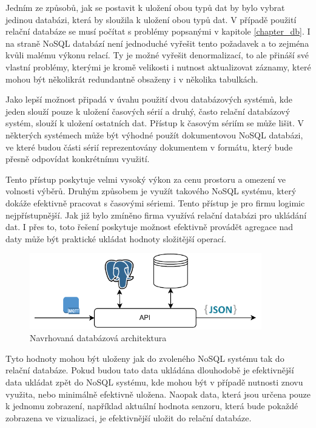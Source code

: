 Jedním ze způsobů, jak se postavit k uložení obou typů dat by bylo vybrat jedinou databázi, která by sloužila k uložení obou typů dat. V případě použití relační databáze se musí počítat s problémy popsanými v kapitole \ref{chapter_db}. I na straně NoSQL databází není jednoduché vyřešit tento požadavek a to zejména kvůli malému výkonu relací. Ty je možné vyřešit denormalizací, to ale přináší své vlastní problémy, kterými je kromě velikosti i nutnost aktualizovat záznamy, které mohou být několikrát redundantně obsaženy i v několika tabulkách.

Jako lepší možnost připadá v úvahu použití dvou databázových systémů, kde jeden slouží pouze k uložení časových sérií a druhý, často relační databázový systém, slouží k uložení ostatních dat. Přístup k časovým sériím se může lišit. V některých systémech může být výhodné použít dokumentovou NoSQL databázi, ve které budou části sérií reprezentovány dokumentem v formátu, který bude přesně odpovídat konkrétnímu využití.

Tento přístup poskytuje velmi vysoký výkon za cenu prostoru a omezení ve volnosti výběrů. Druhým způsobem je využít takového NoSQL systému, který dokáže efektivně pracovat s časovými sériemi. Tento přístup je pro firmu logimic nejpřístupnější. Jak již bylo zmíněno firma využívá relační databázi pro ukládání dat. I přes to, toto řešení poskytuje možnost efektivně provádět agregace nad daty může být praktické ukládat hodnoty složitější operací. 

\begin{figure}[H]
\label{question4}
\begin{center}
    \includegraphics[width=0.9\textwidth]{obrazky-figures/databaseArchitecture.pdf}
\end{center}
\caption{Navrhovaná databázová architektura}
\end{figure}

Tyto hodnoty mohou být uloženy jak do zvoleného NoSQL systému tak do relační databáze. Pokud budou tato data ukládána dlouhodobě je efektivnější data ukládat zpět do NoSQL systému, kde mohou být v případě nutnosti znovu využita, nebo minimálně efektivně uložena. Naopak data, která jsou určena pouze k jednomu zobrazení, například aktuální hodnota senzoru, která bude pokaždé zobrazena ve vizualizaci, je efektivnější uložit do relační databáze.

